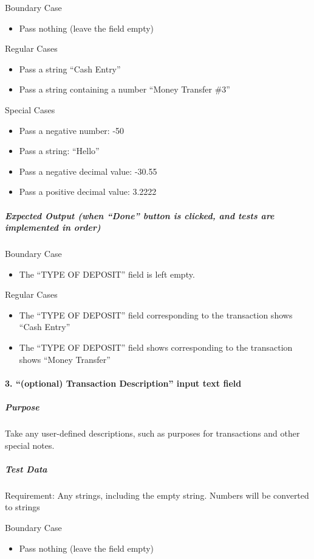 \documentclass[12pt]{article}
\begin{document}
Boundary Case
\begin{itemize}
  \item Pass nothing (leave the field empty)
\end{itemize}

Regular Cases
\begin{itemize}
  \item Pass a string  “Cash Entry”
  \item Pass a string containing a number  “Money Transfer \#3”
\end{itemize}

Special Cases
\begin{itemize}
  \item Pass a negative number: -50
  \item Pass a string: “Hello”
  \item Pass a negative decimal value: -30.55
  \item Pass a positive decimal value: 3.2222
\end{itemize}

\subparagraph{Expected Output (when “Done” button is clicked, and tests are implemented in order)}

Boundary Case
\begin{itemize}
  \item The “TYPE OF DEPOSIT” field is left empty.
\end{itemize}

Regular Cases
\begin{itemize}
  \item The “TYPE OF DEPOSIT” field corresponding to the transaction shows “Cash Entry”
  \item The “TYPE OF DEPOSIT” field shows corresponding to the transaction shows “Money Transfer”
\end{itemize}

\paragraph{3. “(optional) Transaction Description” input text field}
 
\subparagraph{Purpose} Take any user-defined descriptions, such as purposes for transactions and other special notes.
 
\subparagraph{Test Data} Requirement: Any strings, including the empty string. Numbers will be converted to strings
 
Boundary Case
\begin{itemize}
  \item Pass nothing (leave the field empty)
  \end{itemize}
\end{document}
